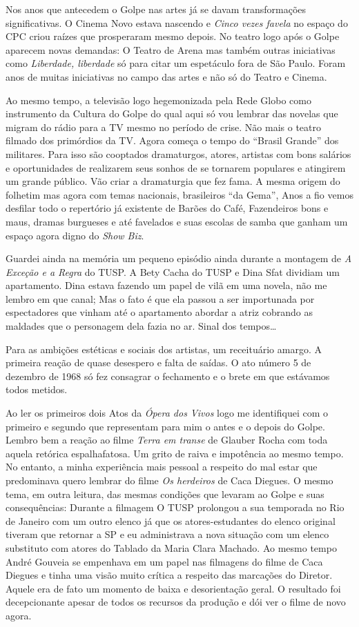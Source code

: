 Nos anos que antecedem o Golpe nas artes já se davam transformações
significativas. O Cinema Novo estava nascendo e \textit{Cinco vezes favela}
no espaço do CPC criou raízes que prosperaram mesmo depois. No teatro
logo após o Golpe aparecem novas demandas: O Teatro de Arena mas também
outras iniciativas como \textit{Liberdade, liberdade} só para citar um
espetáculo fora de São Paulo. Foram anos de muitas iniciativas no campo
das artes e não só do Teatro e Cinema.

Ao mesmo tempo, a televisão logo hegemonizada pela Rede Globo como
instrumento da Cultura do Golpe do qual aqui só vou lembrar das novelas
que migram do rádio para a TV mesmo no período de crise. Não mais o
teatro filmado dos primórdios da TV. Agora começa o tempo do “Brasil
Grande” dos militares. Para isso são cooptados dramaturgos, atores,
artistas com bons salários e oportunidades de realizarem seus sonhos de
se tornarem populares e atingirem um grande público. Vão criar a
dramaturgia que fez fama. A mesma origem do folhetim mas agora com temas
nacionais, brasileiros “da Gema”, Anos a fio vemos desfilar todo o
repertório já existente de Barões do Café, Fazendeiros bons e maus,
dramas burgueses e até favelados e suas escolas de samba que ganham um
espaço agora digno do \textit{Show Biz}.

Guardei ainda na memória um pequeno episódio ainda durante a montagem de
\textit{A Exceção e a Regra} do TUSP. A Bety Cacha do TUSP e Dina Sfat
dividiam um apartamento. Dina estava fazendo um papel de vilã em uma
novela, não me lembro em que canal; Mas o fato é que ela passou a ser
importunada por espectadores que vinham até o apartamento abordar a
atriz cobrando as maldades que o personagem dela fazia no ar. Sinal dos
tempos\ldots{}

Para as ambições estéticas e sociais dos artistas, um receituário
amargo. A primeira reação de quase desespero e falta de saídas. O ato
número 5 de dezembro de 1968 só fez consagrar o fechamento e o brete em
que estávamos todos metidos.

Ao ler os primeiros dois Atos da \textit{Ópera dos Vivos} logo me
identifiquei com o primeiro e segundo que representam para mim o antes e
o depois do Golpe. Lembro bem a reação ao filme \textit{Terra em transe} de
Glauber Rocha com toda aquela retórica espalhafatosa. Um grito de raiva
e impotência ao mesmo tempo. No entanto, a minha experiência mais
pessoal a respeito do mal estar que predominava quero lembrar do filme
\textit{Os herdeiros} de Caca Diegues. O mesmo tema, em outra leitura, das
mesmas condições que levaram ao Golpe e suas consequências: Durante a
filmagem O TUSP prolongou a sua temporada no Rio de Janeiro com um outro
elenco já que os atores-estudantes do elenco original tiveram que
retornar a SP e eu administrava a nova situação com um elenco substituto
com atores do Tablado da Maria Clara Machado. Ao mesmo tempo André
Gouveia se empenhava em um papel nas filmagens do filme de Caca Diegues
e tinha uma visão muito crítica a respeito das marcações do Diretor.
Aquele era de fato um momento de baixa e desorientação geral. O
resultado foi decepcionante apesar de todos os recursos da produção e
dói ver o filme de novo agora.

